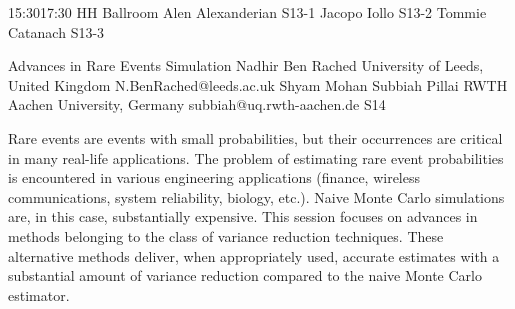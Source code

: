 \documentclass[12pt,lettersize,oneside]{book} %
\begin{document}

\sessionPart{}%
{\hfill{}
{15:30}{17:30} %
{HH Ballroom}} %
{Alen Alexanderian}
{S13-1}
{Jacopo Iollo}
{S13-2}
{Tommie Catanach}
{S13-3}



\clearpage

\begin{session}
 {Advances in Rare Events Simulation}%
 {Nadhir Ben Rached}%
 {University of Leeds, United Kingdom}%
 {N.BenRached@leeds.ac.uk}%
 {Shyam Mohan Subbiah Pillai}%
 {RWTH Aachen University, Germany}%
 {subbiah@uq.rwth-aachen.de}%
 {S14}%
 {}%

 Rare events are events with small probabilities, but their occurrences are critical in many real-life applications. The problem of estimating rare event probabilities is encountered in various engineering applications (finance, wireless communications, system reliability, biology, etc.). Naive Monte Carlo simulations are, in this case, substantially expensive. This session focuses on advances in methods belonging to the class of variance reduction techniques.  These alternative methods deliver, when appropriately used, accurate estimates with a substantial amount of variance reduction compared to the naive Monte Carlo estimator.
\end{session}


\end{document}
